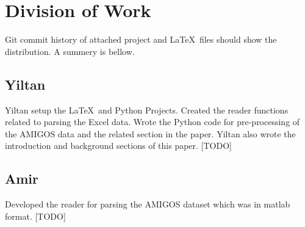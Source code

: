 \section{Division of Work}
Git commit history of attached project and
\LaTeX~files should show the distribution.
A summery is bellow.

\subsection{Yiltan}
Yiltan setup the \LaTeX~and Python Projects.
Created the reader functions related to parsing the Excel data.
Wrote the Python code for pre-processing of the AMIGOS data
and the related section in the paper.
Yiltan also wrote the introduction and background sections of this paper.
[TODO]

\subsection{Amir}
Developed the reader for parsing the AMIGOS dataset
which was in matlab format.
[TODO]
